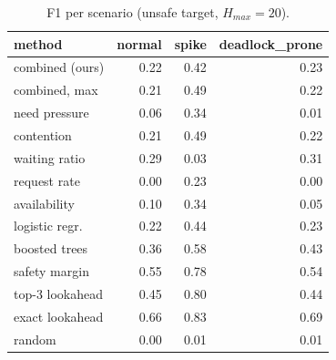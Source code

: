 \begin{table}[t]
\centering
\footnotesize
\caption{F1 per scenario (unsafe target, $H_{max}=20$).}
\label{tab:scenario}
\begin{tabular}{lrrr}
\toprule
method & normal & spike & deadlock\_prone \\
\midrule
combined (ours) & 0.22 & 0.42 & 0.23 \\
combined, max & 0.21 & 0.49 & 0.22 \\
need pressure & 0.06 & 0.34 & 0.01 \\
contention & 0.21 & 0.49 & 0.22 \\
waiting ratio & 0.29 & 0.03 & 0.31 \\
request rate & 0.00 & 0.23 & 0.00 \\
availability & 0.10 & 0.34 & 0.05 \\
logistic regr. & 0.22 & 0.44 & 0.23 \\
boosted trees & 0.36 & 0.58 & 0.43 \\
safety margin & 0.55 & 0.78 & 0.54 \\
top-3 lookahead & 0.45 & 0.80 & 0.44 \\
exact lookahead & 0.66 & 0.83 & 0.69 \\
random & 0.00 & 0.01 & 0.01 \\
\bottomrule
\end{tabular}
\end{table}
